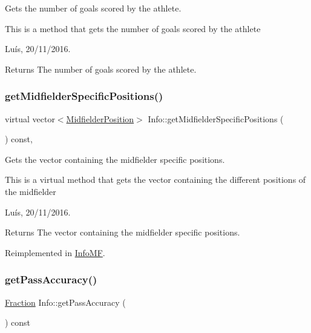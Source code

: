 Gets the number of goals scored by the athlete. 

This is a method that gets the number of goals scored by the athlete

Luís, 20/11/2016. 

\begin{DoxyReturn}{Returns}
The number of goals scored by the athlete. 
\end{DoxyReturn}
\hypertarget{class_info_afb5cbe001c15498897fc4852bd08c114}{}\label{class_info_afb5cbe001c15498897fc4852bd08c114} 
\subsubsection{\texorpdfstring{get\+Midfielder\+Specific\+Positions()}{getMidfielderSpecificPositions()}}
{\footnotesize\ttfamily virtual vector$<$\hyperlink{_utils_8hpp_a9f9328fe291d23e820ad594679abd217}{Midfielder\+Position}$>$ Info\+::get\+Midfielder\+Specific\+Positions (\begin{DoxyParamCaption}{ }\end{DoxyParamCaption}) const\hspace{0.3cm}{\ttfamily [inline]}, {\ttfamily [virtual]}}



Gets the vector containing the midfielder specific positions. 

This is a virtual method that gets the vector containing the different positions of the midfielder

Luís, 20/11/2016. 

\begin{DoxyReturn}{Returns}
The vector containing the midfielder specific positions. 
\end{DoxyReturn}


Reimplemented in \hyperlink{class_info_m_f_a1f91cbfd828fdfd6970a3b91b5c04945}{Info\+MF}.

\hypertarget{class_info_a8891b7452e20bac9e90f3501d39bdec8}{}\label{class_info_a8891b7452e20bac9e90f3501d39bdec8} 
\subsubsection{\texorpdfstring{get\+Pass\+Accuracy()}{getPassAccuracy()}}
{\footnotesize\ttfamily \hyperlink{class_fraction}{Fraction} Info\+::get\+Pass\+Accuracy (\begin{DoxyParamCaption}{ }\end{DoxyParamCaption}) const}




